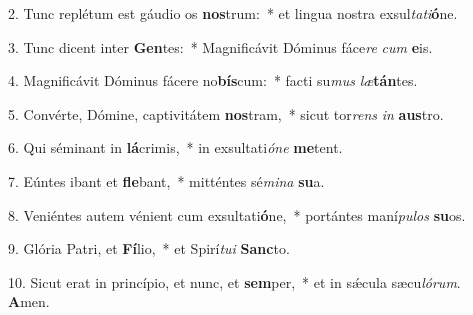 2. Tunc replétum est gáudio os \textbf{nos}trum:~*  et lingua nostra exsul\textit{ta}\textit{ti}\textbf{ó}ne.\

3. Tunc dicent inter \textbf{Gen}tes:~*  Magnificávit Dóminus fáce\textit{re} \textit{cum} \textbf{e}is.\

4. Magnificávit Dóminus fácere no\textbf{bís}cum:~*  facti su\textit{mus} \textit{læ}\textbf{tán}tes.\

5. Convérte, Dómine, captivitátem \textbf{nos}tram,~*  sicut tor\textit{rens} \textit{in} \textbf{aus}tro.\

6. Qui séminant in \textbf{lá}crimis,~*  in exsultati\textit{ó}\textit{ne} \textbf{me}tent.\

7. Eúntes ibant et \textbf{fle}bant,~*  mitténtes sé\textit{mi}\textit{na} \textbf{su}a.\

8. Veniéntes autem vénient cum exsultati\textbf{ó}ne,~*  portántes maní\textit{pu}\textit{los} \textbf{su}os.\

9. Glória Patri, et \textbf{Fí}lio,~*  et Spirí\textit{tu}\textit{i} \textbf{Sanc}to.\

10. Sicut erat in princípio, et nunc, et \textbf{sem}per,~*  et in sǽcula sæcu\textit{ló}\textit{rum}. \textbf{A}men.\

